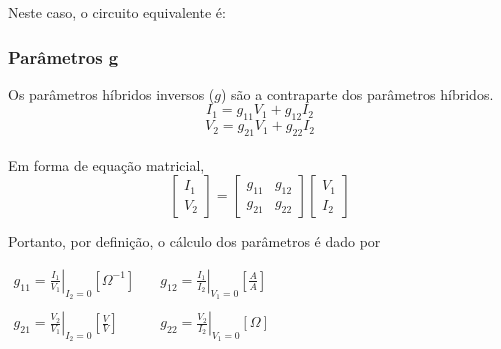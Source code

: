 \documentclass{article}
\numberwithin{equation}{section}
\let\dfr\dfrac
\begin{document}
Neste caso, o circuito equivalente é:

\begin{center}
\end{center}

\subsubsection{Parâmetros g}
Os parâmetros híbridos inversos ($g$) são a contraparte dos parâmetros híbridos.
\begin{equation*}
    I_{1}=g_{11}V_{1}+g_{12}I_{2}
\end{equation*}
\begin{equation*}
    V_{2}=g_{21}V_{1}+g_{22}I_{2}
\end{equation*}\\
Em forma de equação matricial,
\begin{equation}
    \begin{bmatrix}
        I_{1} \\
        V_{2}
    \end{bmatrix}
    = %
    \begin{bmatrix}
        g_{11} & g_{12} \\
        g_{21} & g_{22}
    \end{bmatrix}
    \begin{bmatrix}
        V_{1} \\
        I_{2}
    \end{bmatrix}
\end{equation}

Portanto, por definição, o cálculo dos parâmetros é dado por
\begin{center}
    $\begin{matrix} %
            g_{11}=\displaystyle\left.\frac{I_{1}}{V_{1}}\right|_{I_{2}=0} [\Omega^{-1}] &\quad g_{12}=\displaystyle\left.\frac{I_{1}}{I_{2}}\right|_{V_{1}=0}\left[\frac{A}{A}\right]\\\\
            g_{21}=\displaystyle\left.\frac{V_{2}}{V_{1}}\right|_{I_{2}=0}\left[\frac{V}{V}\right]&\quad
            g_{22}=\displaystyle\left.\frac{V_{2}}{I_{2}}\right|_{V_{1}=0} [\Omega]
    \end{matrix}$
\end{center}
\end{document}

